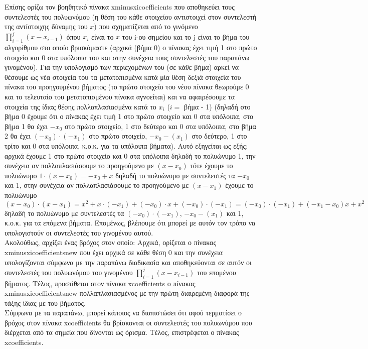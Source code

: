 \documentclass[a4paper,11pt]{article}
\newcommand{\lt}{\latintext}
\begin{document}
Επίσης ορίζω τον βοηθητικό πίνακα {\lt x\textunderscore minus\textunderscore xi\textunderscore coefficients} που αποθηκεύει τους συντελεστές του πολυωνύμου (η θέση του κάθε στοιχείου αντιστοιχεί στον συντελεστή της αντίστοιχης δύναμης του {\lt $x$}) που σχηματίζεται από το γινόμενο {\lt $\prod_{i=1}^{j}(x-x_{i-1})$} όπου {\lt $x_i$} είναι το {\lt $x$} του {\lt i}-ου σημείου και το {\lt j} είναι το βήμα του αλγορίθμου στο οποίο βρισκόμαστε (αρχικά (βήμα 0) ο πίνακας έχει τιμή 1 στο πρώτο στοιχείο και 0 στα υπόλοιπα του και στην συνέχεια τους συντελεστές του παραπάνω γινομένου). Για την υπολογισμό των περιεχομένων του (σε κάθε βήμα) αρκεί να θέσουμε ως νέα στοιχεία του τα μετατοπισμένα κατά μία θέση δεξιά στοιχεία του πίνακα του προηγουμένου βήματος (το πρώτο στοιχείο του νέου πίνακα θεωρούμε 0 και το τελευταίο του μετατοπισμένου πίνακα αγνοείται) και να αφαιρέσουμε τα στοιχεία της ίδιας θέσης πολλαπλασιασμένα κατά το {\lt $x_i$} ({\lt $i = $} βήμα - 1) (δηλαδή στο βήμα 0 έχουμε ότι ο πίνακας έχει τιμή 1 στο πρώτο στοιχείο και 0 στα υπόλοιπα, στο βήμα 1 θα έχει {\lt $-x_0$} στο πρώτο στοιχείο, 1 στο δεύτερο και 0 στα υπόλοιπα, στο βήμα 2 θα έχει {\lt $(-x_0)\cdot (-x_1)$} στο πρώτο στοιχείο, {\lt $-x_0 - (x_1)$} στο δεύτερο, 1 στο τρίτο και 0 στα υπόλοιπα,  κ.ο.κ. για τα υπόλοιπα βήματα). Αυτό εξηγείται ως εξής: αρχικά έχουμε 1 στο πρώτο στοιχείο και 0 στα υπόλοιπα δηλαδή το πολυώνυμο 1, την συνέχεια αν πολλαπλασιάσουμε το προηγούμενο με {\lt $(x - x_0)$} τότε έχουμε το πολυώνυμο {\lt $1\cdot (x-x_0) = -x_0 + x$} δηλαδή το πολυώνυμο με συντελεστές τα {\lt $-x_0$} και 1, στην συνέχεια αν πολλαπλασιάσουμε το προηγούμενο με {\lt $(x - x_1)$} έχουμε το πολυώνυμο {\lt $(x - x_0)\cdot (x - x_1) = x^2 + x\cdot (-x_1) + (-x_0)\cdot x + (-x_0)\cdot (-x_1) = (-x_0)\cdot (-x_1) + (-x_1 -x_0)x + x^2 $} δηλαδή το πολυώνυμο με συντελεστές τα {\lt $(-x_0)\cdot (-x_1)$}, {\lt $-x_0 - (x_1)$} και 1, κ.ο.κ. για τα επόμενα βήματα. Επομένως, βλέπουμε ότι μπορεί με αυτόν τον τρόπο να υπολογιστούν οι συντελεστές του γινομένου αυτού.\\
Ακολούθως, αρχίζει ένας βρόχος στον οποίο: Αρχικά, ορίζεται ο πίνακας {\lt x\textunderscore minus\textunderscore xi\textunderscore coefficients\textunderscore new} που έχει αρχικά σε κάθε θέση 0 και την συνέχεια υπολογίζονται σύμφωνα με την παραπάνω διαδικασία και αποθηκεύονται σε αυτόν οι συντελεστές του πολυωνύμου του γινομένου {\lt $\prod_{i=1}^{j}(x-x_{i-1})$} του επομένου βήματος. Τέλος, προστίθεται στον πίνακα {\lt x\textunderscore coefficients} ο πίνακας {\lt x\textunderscore minus\textunderscore xi\textunderscore coefficients\textunderscore new} πολλαπλασιασμένος με την πρώτη διαιρεμένη διαφορά της τάξης ίδιας με του βήματος.\\
Σύμφωνα με τα παραπάνω, μπορεί κάποιος να διαπιστώσει ότι αφού τερματίσει ο βρόχος στον πίνακα {\lt x\textunderscore coefficients} θα βρίσκονται οι συντελεστές του πολυωνύμου που διέρχεται από τα σημεία που δίνονται ως όρισμα.
Τέλος, επιστρέφεται ο πίνακας {\lt x\textunderscore coefficients}.\\
\end{document}
